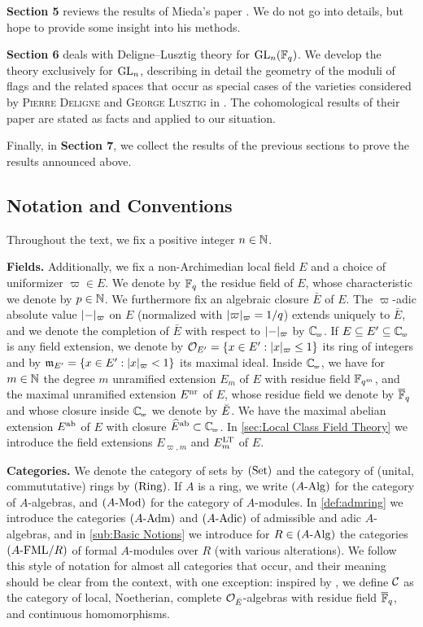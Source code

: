 \documentclass[../main.tex]{subfiles}
\begin{document}
\textbf{Section 5} reviews the results of Mieda's paper \cite{mieda2016geometric}.
We do not go into details, but hope to provide some insight into his methods. 

\textbf{Section 6} deals with Deligne--Lusztig theory for $\operatorname{GL}_n(\mathbb{F}_q)$. 
We develop the theory exclusively for $\operatorname{GL}_n$, describing in detail the 
geometry of the moduli of flags and the related spaces that occur as 
special cases of the varieties considered by 
\textsc{Pierre Deligne} and \textsc{George Lusztig} in
\cite{delignelusztig1976}. The cohomological results of their paper are 
stated as facts and applied to our situation.

Finally, in \textbf{Section 7}, we collect the results of the 
previous sections to prove the results announced above. 

\subsection*{Notation and Conventions} %
Throughout the text, we fix a positive integer $n \in \mathbb{N}$.

\textbf{Fields.} Additionally, we fix a non-Archimedian local field $E$
and a choice of uniformizer $\varpi \in E$. We denote by $\mathbb{F}_q$ the residue
field of $E$, whose characteristic we denote by $p \in \mathbb{N}$. We furthermore fix
an algebraic closure $\bar E$ of $E$. The $\varpi$-adic absolute value $\lvert - \rvert_\varpi$ on $E$ (normalized with $\lvert \varpi \rvert_\varpi = 1/q$) extends uniquely
to $\bar E$, and we denote the completion of $\bar E$ with respect to $\lvert - \rvert_\varpi$ by $\Cp$. If $E \subseteq E' \subseteq \Cp$ is any
field extension, we denote by $\mathcal{O}_{E'} = \{x \in E' : \lvert x \rvert_\varpi \leq 1\}$
its ring of integers and by $\mathfrak{m}_{E'} = \{x \in E' : \lvert x \rvert_{\varpi} < 1\}$ its
maximal ideal. Inside $\Cp$, we have for $m\in \mathbb{N}$ the degree $m$ unramified
extension $E_m$ of $E$ with residue field $\mathbb{F}_{q^m}$, and the maximal unramified extension
$E^{\mathrm{nr}}$ of $E$, whose residue field we denote by ${\overline {\mathbb{F}}_q}$ and whose closure
inside $\Cp$ we denote by ${\breve {E}}$. We have the maximal abelian extension $E^{\mathrm{ab}}$ of 
$E$ with closure $\hat E^\ab \subset \Cp$. In \cref{sec:Local Class Field Theory} we 
introduce the field extensions $E_{\varpi, m}$ and $E^{\mathrm{LT}}_m$ of $E$.

\textbf{Categories.} 
We denote the category of sets by ${(\mathrm{Set})}$ and the category of (unital,
commututative) rings by ${(\mathrm{Ring})}$. If $A$ is a ring, we write ${({A}\textnormal-\allowbreak\mathrm{Alg})}$ for the
category of $A$-algebras, and ${({A}\textnormal-\allowbreak\mathrm{Mod})}$ for the category of $A$-modules.
In \cref{def:admring} we introduce the categories ${({A}\textnormal-\allowbreak\mathrm{Adm})}$ and ${({A}\textnormal-\allowbreak\mathrm{Adic})}$ of 
admissible and adic $A$-algebras, and in \cref{sub:Basic Notions} we introduce 
for $R \in {({A}\textnormal-\allowbreak\mathrm{Alg})}$ the categories ${({A}\textnormal-\allowbreak\mathrm{FML}/{R})}$ of formal $A$-modules over $R$
(with various alterations). We follow this style of notation for almost all categories
that occur, and their meaning should be clear from the context, with one exception:
inspired by \cite{drinfel1974elliptic}, we define $\mathcal{C}$ as the category of
local, Noetherian, complete $\mathcal{O}_{\breve {E}}$-algebras with residue field ${\overline {\mathbb{F}}_q}$,
and continuous homomorphisms.
\end{document}
